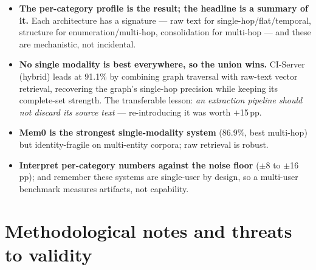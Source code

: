 \documentclass[11pt]{article}
\begin{document}
\begin{itemize}[nosep]
  \item \textbf{The per-category profile is the result; the headline is a summary of it.} Each architecture has
  a signature --- raw text for single-hop/flat/temporal, structure for enumeration/multi-hop, consolidation for
  multi-hop --- and these are mechanistic, not incidental.
  \item \textbf{No single modality is best everywhere, so the union wins.} CI-Server (hybrid) leads at 91.1\%
  by combining graph traversal with raw-text vector retrieval, recovering the graph's single-hop precision
  while keeping its complete-set strength. The transferable lesson: \emph{an extraction pipeline should not
  discard its source text} --- re-introducing it was worth $+$15\,pp.
  \item \textbf{Mem0 is the strongest single-modality system} (86.9\%, best multi-hop) but identity-fragile on
  multi-entity corpora; raw retrieval is robust.
  \item \textbf{Interpret per-category numbers against the noise floor} ($\pm$8 to $\pm$16\,pp); and remember
  these systems are single-user by design, so a multi-user benchmark measures artifacts, not capability.
\end{itemize}

\appendix
\section{Methodological notes and threats to validity}\label{sec:validity}
\end{document}

